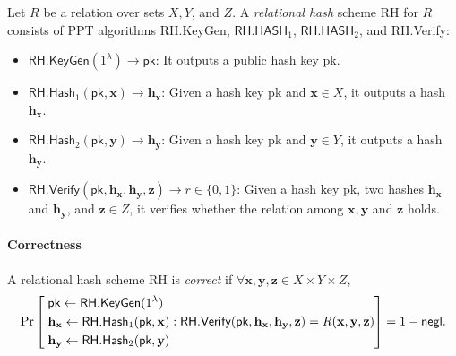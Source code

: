 


\begin{definition}
\label{def:rh}
	Let $R$ be a relation over sets $X, Y$, and $Z$. A \emph{relational hash} scheme \textsf{RH} for $R$ consists of PPT algorithms \textsf{RH.KeyGen}, $\textsf{RH.HASH}_1$, $\textsf{RH.HASH}_2$, and \textsf{RH.Verify}:
	
	\begin{itemize}
	
		\item $\textsf{RH.KeyGen}(1^\lambda) \to \textsf{pk}$: It outputs a public hash key \textsf{pk}.  
			
		\item $\textsf{RH.Hash}_1(\textsf{pk}, \mathbf{x}) \to \mathbf{h_x}$: Given a hash key \textsf{pk} and $\mathbf{x} \in X$, it outputs a hash $\mathbf{h_x}$.

		\item $\textsf{RH.Hash}_2(\textsf{pk}, \mathbf{y}) \to \mathbf{h_y}$: Given a hash key \textsf{pk} and $\mathbf{y} \in Y$, it outputs a hash $\mathbf{h_y}$.

		\item $\textsf{RH.Verify}(\textsf{pk}, \mathbf{h_x}, \mathbf{h_y}, \mathbf{z}) \to r \in \{0, 1\}$: Given a hash key \textsf{pk}, two hashes $\mathbf{h_x}$ and $\mathbf{h_y}$, and $\mathbf{z} \in Z$, it verifies whether the relation among $\mathbf{x}, \mathbf{y}$ and $\mathbf{z}$ holds.

	\end{itemize}

	\paragraph{\textbf{Correctness}} A relational hash scheme \textsf{RH} is \emph{correct} if $\forall \mathbf{x}, \mathbf{y}, \mathbf{z} \in X \times Y \times Z$,
	\[
		\Pr \left [
			\begin{aligned} 
				 &\; \textsf{pk} \gets \textsf{RH.KeyGen}(1^\lambda) \\
				 &\; \mathbf{h_x} \gets \textsf{RH.Hash}_1(\textsf{pk}, \mathbf{x}) \\
				 &\; \mathbf{h_y} \gets \textsf{RH.Hash}_2(\textsf{pk}, \mathbf{y})
			\end{aligned} :
			\textsf{RH.Verify}(\textsf{pk}, \mathbf{h_x}, \mathbf{h_y}, \mathbf{z}) = R(\mathbf{x}, \mathbf{y}, \mathbf{z})
			\right ] = 1 - \mathsf{negl}.
	\]
\end{definition}

